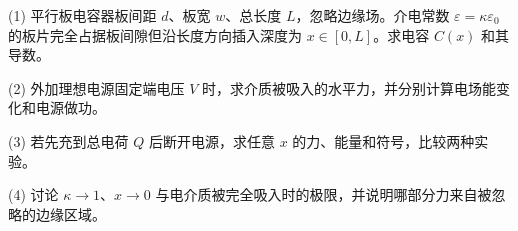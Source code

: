 (1) 平行板电容器板间距 \(d\)、板宽 \(w\)、总长度 \(L\)，忽略边缘场。介电常数 \(\varepsilon=\kappa\varepsilon_0\) 的板片完全占据板间隙但沿长度方向插入深度为 \(x\in[0,L]\)。求电容 \(C(x)\) 和其导数。

(2) 外加理想电源固定端电压 \(V\) 时，求介质被吸入的水平力，并分别计算电场能变化和电源做功。

(3) 若先充到总电荷 \(Q\) 后断开电源，求任意 \(x\) 的力、能量和符号，比较两种实验。

(4) 讨论 \(\kappa\to1\)、\(x\to0\) 与电介质被完全吸入时的极限，并说明哪部分力来自被忽略的边缘区域。
